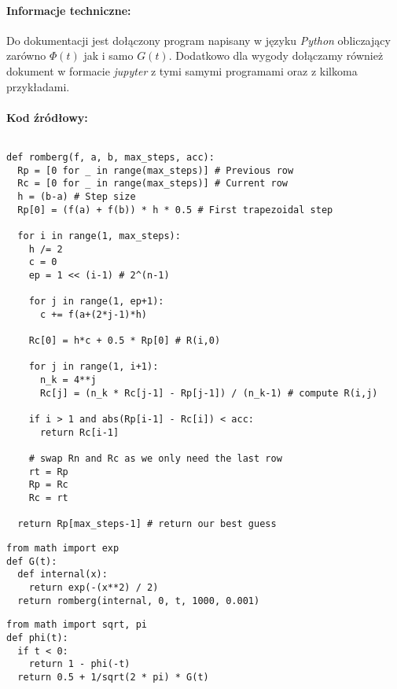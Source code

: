 \documentclass[12pt,oneside,a4paper]{article}
\begin{document}
\paragraph{Informacje techniczne:\\}
Do dokumentacji jest dołączony program napisany w języku \textit{Python} obliczający zarówno $\Phi(t)$ jak i samo $G(t)$. Dodatkowo dla wygody dołączamy również dokument w formacie \textit{jupyter} z tymi samymi programami oraz z kilkoma przykładami.



\paragraph{Kod źródłowy:}
$ $
\begin{lstlisting}[title={Metoda Romberga}]
def romberg(f, a, b, max_steps, acc):
  Rp = [0 for _ in range(max_steps)] # Previous row
  Rc = [0 for _ in range(max_steps)] # Current row
  h = (b-a) # Step size
  Rp[0] = (f(a) + f(b)) * h * 0.5 # First trapezoidal step

  for i in range(1, max_steps):
    h /= 2
    c = 0
    ep = 1 << (i-1) # 2^(n-1)

    for j in range(1, ep+1):
      c += f(a+(2*j-1)*h)

    Rc[0] = h*c + 0.5 * Rp[0] # R(i,0)

    for j in range(1, i+1):
      n_k = 4**j
      Rc[j] = (n_k * Rc[j-1] - Rp[j-1]) / (n_k-1) # compute R(i,j)

    if i > 1 and abs(Rp[i-1] - Rc[i]) < acc:
      return Rc[i-1]

    # swap Rn and Rc as we only need the last row
    rt = Rp
    Rp = Rc
    Rc = rt

  return Rp[max_steps-1] # return our best guess
\end{lstlisting}

\newpage

\begin{lstlisting}[title={Definicja funkcji $G(t)$}]
from math import exp
def G(t):
  def internal(x):
    return exp(-(x**2) / 2)
  return romberg(internal, 0, t, 1000, 0.001)
\end{lstlisting}

\begin{lstlisting}[title={Definicja funkcji $\Phi(t)$}]
from math import sqrt, pi
def phi(t):
  if t < 0:
    return 1 - phi(-t)
  return 0.5 + 1/sqrt(2 * pi) * G(t)
\end{lstlisting}
\end{document}
